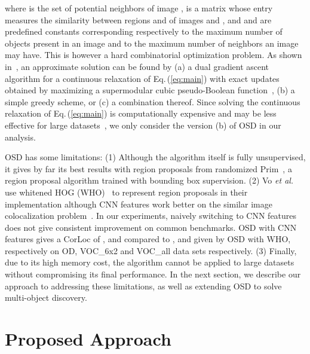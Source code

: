 \documentclass[runningheads]{llncs}
\begin{document}
where  is the set of potential neighbors of image ,  is a  matrix whose entry 
measures the similarity between regions  and  of images  and
, and  and  are predefined constants corresponding
respectively to the maximum number of objects present in an image and
to the maximum number of neighbors an image may have.
This is however a hard combinatorial optimization problem. As shown in~\cite{Vo2019UnsupOptim}, an approximate solution can be found by (a) a dual gradient ascent algorithm for a continuous relaxation of Eq.\,(\ref{eq:main}) with exact updates obtained by maximizing a supermodular cubic pseudo-Boolean function~\cite{Bach13,NeOz09}, (b) a simple greedy scheme, or (c) a combination thereof. Since solving the continuous relaxation of Eq.\,(\ref{eq:main}) is computationally expensive and may be less effective for large datasets~\cite{Vo2019UnsupOptim}, we only consider the version (b) of OSD in our analysis.

 OSD has some limitations: (1) Although the algorithm itself is fully unsupervised, it gives by far its best results with region proposals from randomized Prim~\cite{Manen2013prim}, a region proposal algorithm trained with bounding box supervision. (2) Vo {\em et al.} use whitened HOG (WHO)~\cite{hariharan2012discriminative} to represent region proposals in their implementation although CNN features work better on the similar image colocalization problem~\cite{Li2016mimick,Wei2019ddtplus}. In our experiments, naively switching to CNN features does not give consistent improvement on common benchmarks. OSD with CNN features gives a CorLoc of ,  and  compared to ,  and  given by OSD with WHO, respectively on OD, VOC\_6x2 and VOC\_all data sets respectively.  (3) Finally, due to its high memory cost, the algorithm cannot be applied to large datasets without compromising its final performance. In the next section, we describe our approach to addressing these limitations, as well as extending OSD to solve multi-object discovery.


\section{Proposed Approach}
\end{document}
